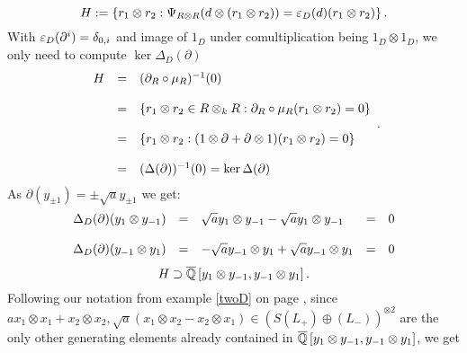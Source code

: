 $$H:= \left\{r_1 \otimes r_2 : \Psi_{R\otimes R}(d \otimes (r_1 \otimes r_2)) = \eps_D(d) (r_1 \otimes r_2)\right\}.$$
With $\eps_D(\partial^i) = \delta_{0,i}$ and image of $1_D$ under comultiplication being $1_D\otimes 1_D$, we only need to compute $\ker \Delta_D(\partial)$
$$\bao{rcl}
H &=& (\partial_R \circ \mu_R)^{-1}(0)\\
&&\\
&=& \{r_1 \otimes r_2 \in R\otimes_k R : \partial_R \circ \mu_R (r_1 \otimes r_2) = 0\}\\
&&\\
&=& \{r_1 \otimes r_2 : (1 \otimes \partial + \partial \otimes 1)(r_1 \otimes r_2) = 0\}\\
&&\\
&=& (\Delta (\partial))^{-1}(0) = \ker \Delta(\partial)\\
\ea.$$
As $\partial(y_{\pm 1}) = \pm \sqrt{a} y_{\pm 1}$ we get:
$$\bao{rclcl}
\Delta_D(\partial)(y_1 \otimes y_{-1}) &=& \sqrt{a} y_1 \otimes y_{-1} - \sqrt{a} y_{1} \otimes y_{-1} &=& 0\\
&&&&\\
\Delta_D(\partial)(y_{-1} \otimes y_{1}) &=& -\sqrt{a} y_{-1} \otimes y_{1} + \sqrt{a} y_{-1} \otimes y_{1} &=& 0\\
\ea$$
$$H \supset \currfield\left[y_1\otimes y_{-1},y_{-1} \otimes y_1\right].$$
Following our notation from example \ref{twoD} on page \pageref{twoD}, since $a x_1 \otimes x_1 + x_2 \otimes x_2, \sqrt{a} (x_1 \otimes x_2 - x_2 \otimes x_1) \in \left(S(L_+)\oplus (L_-)\right)^{\otimes 2}$ are the only other generating elements already contained in $\currfield\left[y_1\otimes y_{-1},y_{-1} \otimes y_1\right]$, we get
